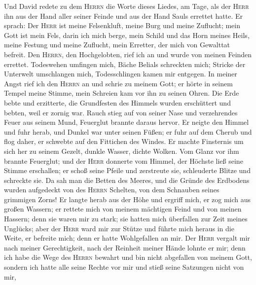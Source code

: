  Und David redete zu dem \textsc{Herrn} die Worte dieses
Liedes, am Tage, als der \textsc{Herr} ihn aus der Hand aller seiner
Feinde und aus der Hand Sauls errettet hatte.  Er sprach:
Der \textsc{Herr} ist meine Felsenkluft, meine Burg und meine Zuflucht;
 mein Gott ist mein Fels, darin ich mich berge, mein
Schild und das Horn meines Heils, meine Festung und meine Zuflucht, mein
Erretter, der mich von Gewalttat befreit.  Den
\textsc{Herrn}, den Hochgelobten, rief ich an und wurde von meinen
Feinden errettet.  Todeswehen umfingen mich, Bäche Belials
schreckten mich;  Stricke der Unterwelt umschlangen mich,
Todesschlingen kamen mir entgegen.  In meiner Angst rief
ich den \textsc{Herrn} an und schrie zu meinem Gott; er hörte in seinem
Tempel meine Stimme, mein Schreien kam vor ihn zu seinen Ohren.
 Die Erde bebte und erzitterte, die Grundfesten des
Himmels wurden erschüttert und bebten, weil er zornig war.
 Rauch stieg auf von seiner Nase und verzehrendes Feuer
aus seinem Mund, Feuerglut brannte daraus hervor.  Er
neigte den Himmel und fuhr herab, und Dunkel war unter seinen Füßen;
 er fuhr auf dem Cherub und flog daher, er schwebte auf
den Fittichen des Windes.  Er machte Finsternis um sich
her zu seinem Gezelt, dunkle Wasser, dichte Wolken.  Vom
Glanz vor ihm brannte Feuerglut;  und der \textsc{Herr}
donnerte vom Himmel, der Höchste ließ seine Stimme erschallen;
 er schoß seine Pfeile und zerstreute sie, schleuderte
Blitze und schreckte sie.  Da sah man die Betten des
Meeres, und die Gründe des Erdbodens wurden aufgedeckt von des
\textsc{Herrn} Schelten, von dem Schnauben seines grimmigen Zorns!
 Er langte herab aus der Höhe und ergriff mich, er zog
mich aus großen Wassern;  er rettete mich von meinem
mächtigen Feind und von meinen Hassern; denn sie waren mir zu stark;
 sie hatten mich überfallen zur Zeit meines Unglücks;
aber der \textsc{Herr} ward mir zur Stütze  und führte
mich heraus in die Weite, er befreite mich; denn er hatte Wohlgefallen
an mir.  Der \textsc{Herr} vergalt mir nach meiner
Gerechtigkeit, nach der Reinheit meiner Hände lohnte er mir;
 denn ich habe die Wege des \textsc{Herrn} bewahrt und
bin nicht abgefallen von meinem Gott,  sondern ich hatte
alle seine Rechte vor mir und stieß seine Satzungen nicht von mir,

